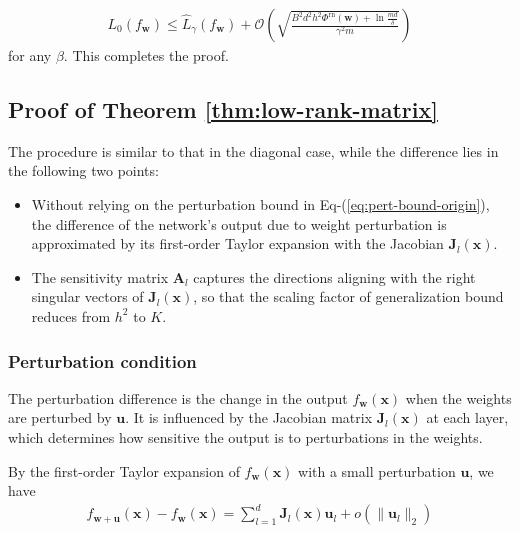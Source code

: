 \documentclass[10pt,a4paper]{amsart}
\newcommand{\Norm}[1]{\|#1\|}
\def\eqref#1{Eq-(\ref{#1})}
\def\mA{{\bm{A}}}
\def\mJ{{\bm{J}}}
\def\vu{{\bm{u}}}
\def\vw{{\bm{w}}}
\def\vx{{\bm{x}}}
\begin{document}
\begin{align}
    L_0(f_{\vw}) \le \hat{L}_{\gamma}(f_{\vw}) + \mathcal{O} \left( \sqrt{ \frac{B^2d^2h^2 \Phi^{\mathrm{rn}}(\vw) + \ln \frac{md}{\delta}}{\gamma^2m}} \right)
\end{align}
for any $\beta$. 
This completes the proof.



\subsection{Proof of Theorem \ref{thm:low-rank-matrix}}
\label{proof:low-rank-matrix}
The procedure is similar to that in the diagonal case, while the difference lies in the following two points:
\begin{itemize}
    \item Without relying on the perturbation bound in \eqref{eq:pert-bound-origin}, the difference of the network's output due to weight perturbation is approximated by its first-order Taylor expansion with the Jacobian $\mJ_l(\vx)$.
    \item The sensitivity matrix $\mA_l$ captures the directions aligning with the right singular vectors of $\mJ_l(\vx)$, so that the scaling factor of generalization bound reduces from $h^2$ to $K$.
\end{itemize}
\subsubsection{Perturbation condition}
The perturbation difference is the change in the output $f_{\vw}(\vx)$ when the weights are perturbed by $\vu$. It is influenced by the Jacobian matrix $\mJ_l(\vx)$ at each layer, which determines how sensitive the output is to perturbations in the weights.

By the first-order Taylor expansion of $f_{\vw}(\vx)$ with a small perturbation $\vu$, we have
\begin{align}
    f_{\vw+\vu}(\vx) - f_{\vw}(\vx) = \sum_{l=1}^d \mJ_l(\vx) \vu_l  + o(\Norm{\vu_l}_2)
\end{align}
\end{document}
